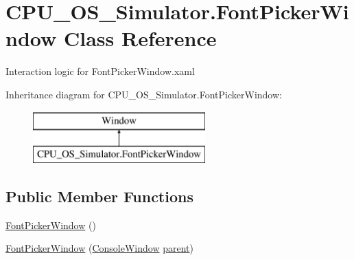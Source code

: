 \hypertarget{class_c_p_u___o_s___simulator_1_1_font_picker_window}{}\section{C\+P\+U\+\_\+\+O\+S\+\_\+\+Simulator.\+Font\+Picker\+Window Class Reference}
\label{class_c_p_u___o_s___simulator_1_1_font_picker_window}


Interaction logic for Font\+Picker\+Window.\+xaml  


Inheritance diagram for C\+P\+U\+\_\+\+O\+S\+\_\+\+Simulator.\+Font\+Picker\+Window\+:\begin{figure}[H]
\begin{center}
\leavevmode
\includegraphics[height=2.000000cm]{class_c_p_u___o_s___simulator_1_1_font_picker_window}
\end{center}
\end{figure}
\subsection*{Public Member Functions}
\begin{DoxyCompactItemize}
\item 
\hyperlink{class_c_p_u___o_s___simulator_1_1_font_picker_window_ac395cdfa521446c47bfded624bbfdba6}{Font\+Picker\+Window} ()
\item 
\hyperlink{class_c_p_u___o_s___simulator_1_1_font_picker_window_a8ff9dfbc882890c0b7b76468d51dd386}{Font\+Picker\+Window} (\hyperlink{class_c_p_u___o_s___simulator_1_1_console_window}{Console\+Window} \hyperlink{class_c_p_u___o_s___simulator_1_1_font_picker_window_a4e59cc593e060f3229adc8decfeb151c}{parent})
\end{DoxyCompactItemize}
